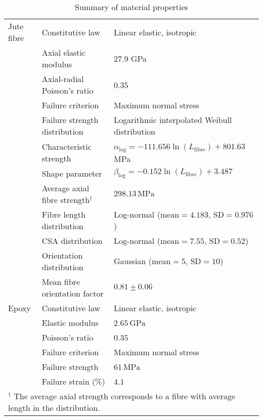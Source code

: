 	\begin{table}[!b]
	\centering\small
	\caption{Summary of material properties}\label{table:mech_p}
	\begin{tabular}{p{}p{}p{}}
	\toprule
	\bfs{Material} 	& \bfs{Parameter} 	& \bfs{Value}\\
	\toprule
	Jute fibre		& Constitutive law				& Linear elastic, isotropic\\
					& Axial elastic modulus				& $27.9$ GPa~\autocite{Virk.2013} \\
					& Axial-radial Poisson's ratio				& $0.35$~\autocite{Virk.2016} \\
					& Failure criterion				& Maximum normal stress \\
					& Failure strength distribution	& Logarithmic interpolated Weibull distribution~\autocite{Virk.2011}\\
					& Characteristic strength&$\alpha_\text{log}=-111.656\ln(L_\text{fibre})+801.63$\, MPa\\ 
					& Shape parameter&$\beta_\text{log}=-0.152\ln(L_\text{fibre})+3.487$\\
					& Average axial fibre strength$^\dagger$ & $298.13\,\text{MPa}$\\
					& Fibre length distribution			& Log-normal ($\text{mean}=4.183$, $\text{SD}=0.976$)\\%
					& CSA distribution				& Log-normal ($\text{mean}=7.55$, $\text{SD}=0.52$)\\%
					& Orientation distribution		& Gaussian ($\text{mean}=5$, $\text{SD}=10$) \\
					& Mean fibre orientation factor & $0.81\pm0.06$\\\midrule
	Epoxy			& Constitutive law				& Linear elastic, isotropic\\
					& Elastic modulus				& $2.65\,\text{GPa}$~\autocite{Virk.2013} \\
					& Poisson's ratio				& $0.35$~\autocite{Virk.2016} \\
					& Failure criterion				& Maximum normal stress\\
					& Failure strength				& $61\,\text{MPa}$~\autocite{Virk.2013}\\
					& Failure strain (\%)			& $4.1$~\autocite{Virk.2013}\\\midrule
	\multicolumn{3}{l}{$^\dagger$ The average axial strength corresponds to a fibre with average length in the distribution.}\\\bottomrule
	\end{tabular}
	\end{table}

